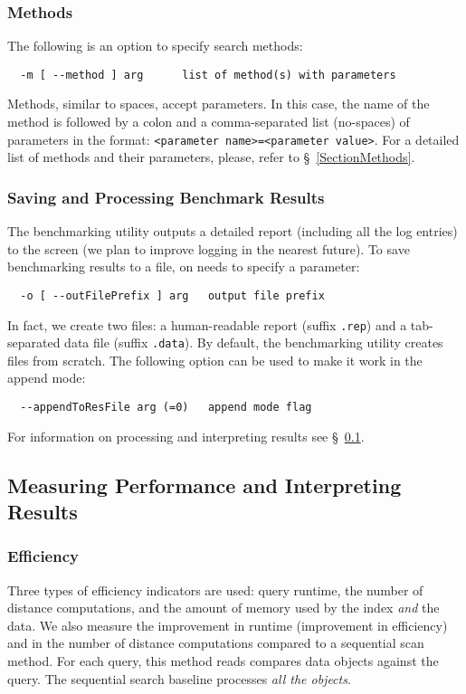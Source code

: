 \documentclass[runningheads,a4paper]{llncs}
\newcommand{\ttt}[1]{\texttt{#1}}
\begin{document}
{\subsubsection{Methods}
The following is an option to specify search methods:
\begin{verbatim}
  -m [ --method ] arg      list of method(s) with parameters
\end{verbatim}
Methods, similar to spaces, accept parameters. 
In this case,
the name of the method is followed by a colon and a comma-separated list (no-spaces)
of parameters in the format:
\ttt{<parameter name>=<parameter value>}.
For a detailed list of methods and their parameters, please, refer to \S~\ref{SectionMethods}.

\subsubsection{Saving and Processing Benchmark Results}
The benchmarking utility outputs a detailed report (including all the log entries) to the screen
(we plan to improve logging in the nearest future).
To save benchmarking results to a file, on needs to specify a parameter:
\begin{verbatim}
  -o [ --outFilePrefix ] arg   output file prefix
\end{verbatim}
In fact, we create two files: a human-readable report (suffix \ttt{.rep}) and 
a tab-separated data file (suffix \ttt{.data}).
By default, the benchmarking utility creates files from scratch. The
following option can be used to make it work in the append mode:
\begin{verbatim}
  --appendToResFile arg (=0)   append mode flag
\end{verbatim}
For information on processing and interpreting results see \S~\ref{SectionMeasurePerf}.

\subsection{Measuring Performance and Interpreting Results}\label{SectionMeasurePerf}
\subsubsection{Efficiency}
Three types of efficiency indicators are used: query runtime, the number of distance computations,
and the amount of memory used by the index \emph{and} the data.
We also measure the improvement in runtime (improvement in efficiency) 
and in the number of distance computations compared to a sequential scan method. 
For each query, this method reads compares data objects against the query.
The sequential search baseline processes \emph{all the objects}. 

}
\end{document}
